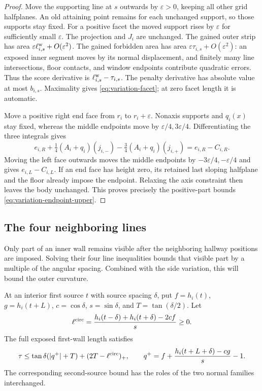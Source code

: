 \begin{proof}
Move the supporting line at $s$ outwards by $\varepsilon>0$, keeping
all other grid halfplanes. An old attaining point remains for each
unchanged support, so those supports stay fixed. For a positive
facet the moved support rises by $\varepsilon$ for sufficiently
small $\varepsilon$. The projection and $J_i$ are unchanged.
The gained outer strip has area
$\varepsilon\ell^{\rm w}_{i,s}+O(\varepsilon^2)$. The gained
forbidden area has area
$\varepsilon\tau_{i,s}+O(\varepsilon^2)$: an exposed inner
segment moves by its normal displacement, and finitely many line
intersections, floor contacts, and window endpoints contribute
quadratic errors. Thus the score derivative is
$\ell^{\rm w}_{i,s}-\tau_{i,s}$. The penalty derivative has absolute
value at most $b_{i,s}$. Maximality gives
\eqref{eq:variation-facet}; at zero facet length it is automatic.

Move a positive right end face from $r_i$ to $r_i+\varepsilon$.
Nonaxis supports and $q_i(x)$ stay fixed, whereas the middle
endpoints move by $\varepsilon/4,3\varepsilon/4$. Differentiating
the three integrals gives
\[
 e_{i,R}+\tfrac14(A_i+q_i)(j_{i,-})
          -\tfrac34(A_i+q_i)(j_{i,+})=e_{i,R}-C_{i,R}.
\]
Moving the left face outwards moves the middle endpoints by
$-3\varepsilon/4,-\varepsilon/4$ and gives $e_{i,L}-C_{i,L}$.
If an end face has height zero, its retained last sloping halfplane
and the floor already impose the endpoint. Relaxing the axis
constraint then leaves the body unchanged. This proves precisely
the positive-part bounds \eqref{eq:variation-endpoint-upper}.
\end{proof}

\subsection{The four neighboring lines}

Only part of an inner wall remains visible after the neighboring
hallway positions are imposed. Solving their four line inequalities
bounds that visible part by a multiple of the angular spacing. Combined
with the side variation, this will bound the outer curvature.

\begin{lemma}\label{lem:variation-neighbors}
At an interior first source $t$ with source spacing $\delta$, put
$f=h_i(t)$, $g=h_i(t+L)$, $c=\cos\delta$, $s=\sin\delta$,
and $T=\tan(\delta/2)$. Let
\[
 \ell^{\rm circ}=
 \frac{h_i(t-\delta)+h_i(t+\delta)-2cf}{s}\ge0.
\]
The full exposed first-wall length satisfies
\begin{equation}\label{eq:variation-neighbor}
 \tau\le\tan\delta(|q^+|+T)+(2T-\ell^{\rm circ})_+,
 \qquad q^+=f+\frac{h_i(t+L+\delta)-cg}{s}-1.
\end{equation}
The corresponding second-source bound has the roles of the two
normal families interchanged.
\end{lemma}

